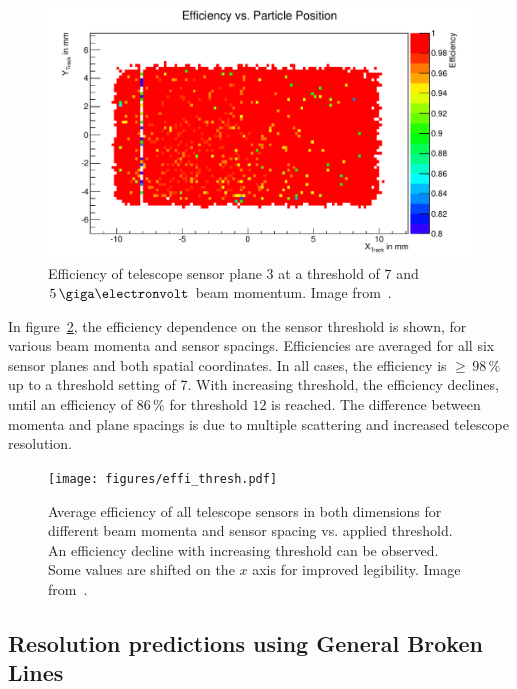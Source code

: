 \begin{figure}[tbp]
  \centering
  \includegraphics[width=\textwidth]{figures/plane3_effi_run37.pdf}
  \caption[Telescope sensor efficiency~\cite{ref:thomas}]{Efficiency of telescope sensor plane $3$ at a threshold of $7$ and $5\,\giga\electronvolt$ beam momentum.
Image from~\cite{ref:thomas}.}
\label{fig:effi}
\end{figure}

In figure~\ref{fig:effi_thresh}, the efficiency dependence on the sensor threshold is shown, for various beam momenta and sensor spacings.
Efficiencies are averaged for all six sensor planes and both spatial coordinates.
In all cases, the efficiency is $\ge\,98\,\%$ up to a threshold setting of 7.
With increasing threshold, the efficiency declines, until an efficiency of $86\,\%$ for threshold $12$ is reached.
The difference between momenta and plane spacings is due to multiple scattering and increased telescope resolution.

\begin{figure}[tbp]
  \centering
  \texttt{[image: figures/effi\_thresh.pdf]}
  \caption[Overall telescope sensor efficiency vs. threshold for different beam momenta and sensor spacings~\cite{ref:thomas}]{
 Average efficiency of all telescope sensors in both dimensions for different beam momenta and sensor spacing vs. applied threshold.
An efficiency decline with increasing threshold can be observed.
Some values are shifted on the $x$ axis for improved legibility.
Image from~\cite{ref:thomas}.}
\label{fig:effi_thresh}
\end{figure}

\subsection{Resolution predictions using General Broken Lines}

